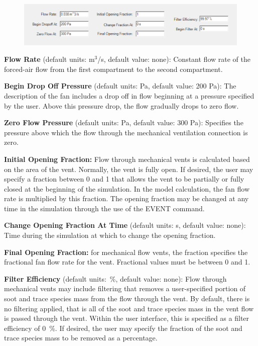 \begin{figure}[h!]
\begin{center}
\includegraphics[width=4.487in]{FIGURES/Input_File/Mechanical_Vent_Flowrate}
\end{center}
\end{figure}

\textbf{Flow Rate} (default units: m$^3$/s, default value: none): Constant flow rate of the forced-air flow from the first compartment to the second compartment.

\textbf{Begin Drop Off Pressure} (default units: Pa, default value: 200 Pa): The description of the fan includes a drop off in flow beginning at a pressure specified by the user.  Above this pressure drop, the flow gradually drops to zero flow.

\textbf{Zero Flow Pressure} (default units: Pa, default value: 300 Pa): Specifies the pressure above which the flow through the mechanical ventilation connection is zero.

\textbf{Initial Opening Fraction:} Flow through mechanical vents is calculated based on the area of the vent.  Normally, the vent is fully open.  If desired, the user may specify a fraction between 0 and 1 that allows the vent to be partially or fully closed at the beginning of the simulation.  In the model calculation, the fan flow rate is multiplied by this fraction.  The opening fraction may be changed at any time in the simulation through the use of the EVENT command.

\textbf{Change Opening Fraction At Time} (default units: s, default value: none): Time during the simulation at which to change the opening fraction.

\textbf{Final Opening Fraction:} for mechanical flow vents, the fraction specifies the fractional fan flow rate for the vent. Fractional values must be between 0 and 1.

\textbf{Filter Efficiency} (default units:~\%, default value: none): Flow through mechanical vents may include filtering that removes a user-specified portion of soot and trace species mass from the flow through the vent.  By default, there is no filtering applied, that is all of the soot and trace species mass in the vent flow is passed through the vent. Within the user interface, this is specified as a filter efficiency of 0~\%.  If desired, the user may specify the fraction of the soot and trace species mass to be removed as a percentage.

